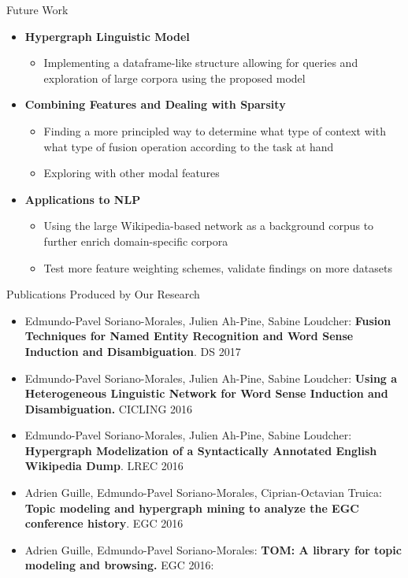 \documentclass[10pt,xcolor=table]{beamer}
\begin{document}
\begin{frame}{Future Work}
\begin{itemize}[<+- | alert@+>]
\item \textbf{Hypergraph Linguistic Model}
	\begin{itemize}
	\item Implementing a dataframe-like structure allowing for queries and exploration of large corpora using the proposed model
	\end{itemize}
\item \textbf{Combining Features and Dealing with Sparsity}
	\begin{itemize}
	\item Finding a more principled way to determine what type of
		context with what type of fusion operation according to the task at hand
	\item Exploring with other modal features
	\end{itemize}
\item \textbf{Applications to NLP}
	\begin{itemize}
	\item Using the large Wikipedia-based network as a background corpus to further enrich domain-specific corpora
	\item Test more feature weighting schemes, validate findings on more datasets
	\end{itemize}
\end{itemize}


\end{frame}




\begin{frame}{Publications Produced by Our Research}
\begin{itemize}
	\item \small Edmundo-Pavel Soriano-Morales, Julien Ah-Pine, Sabine Loudcher: \textbf{Fusion Techniques for Named Entity Recognition and Word Sense Induction and Disambiguation}. DS 2017
	\item \small Edmundo-Pavel Soriano-Morales, Julien Ah-Pine, Sabine Loudcher:
	\textbf{Using a Heterogeneous Linguistic Network for Word Sense Induction and Disambiguation.} CICLING 2016
	\item \small Edmundo-Pavel Soriano-Morales, Julien Ah-Pine, Sabine Loudcher:
		\textbf{Hypergraph Modelization of a Syntactically Annotated English Wikipedia Dump}. LREC 2016
	\item \small Adrien Guille, Edmundo-Pavel Soriano-Morales, Ciprian-Octavian Truica:
\textbf{Topic modeling and hypergraph mining to analyze the EGC conference history}. EGC 2016
\item \small Adrien Guille, Edmundo-Pavel Soriano-Morales:
\textbf{TOM: A library for topic modeling and browsing.} EGC 2016:

\end{itemize}
\end{frame}
\end{document}
